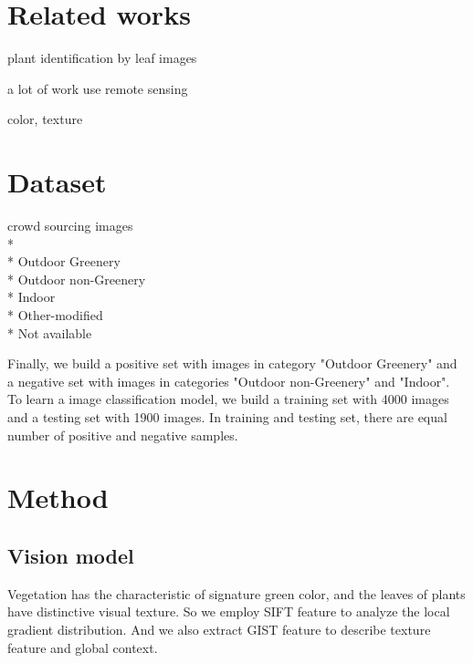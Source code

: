 \documentclass[10pt,twocolumn,letterpaper]{article}
\begin{document}
\section{Related works}

plant identification by leaf images

a lot of work use remote sensing 

color, texture






\section{Dataset}

crowd sourcing images\\*\\*
Outdoor Greenery\\*
Outdoor non-Greenery\\*
Indoor\\*
Other-modified\\*
Not available

Finally, we build a positive set with images in category "Outdoor Greenery" and a negative set with images in categories "Outdoor non-Greenery" and "Indoor". To learn a image classification model, we build a training set with 4000 images and a testing set with 1900 images. In training and testing set, there are equal number of positive and negative samples.

\section{Method}
	

\subsection{Vision model}
Vegetation has the characteristic of signature green color, and the leaves of plants have distinctive visual texture. So we employ SIFT feature to analyze the local gradient distribution. And we also extract GIST feature to describe texture feature and global context. 
\end{document}
